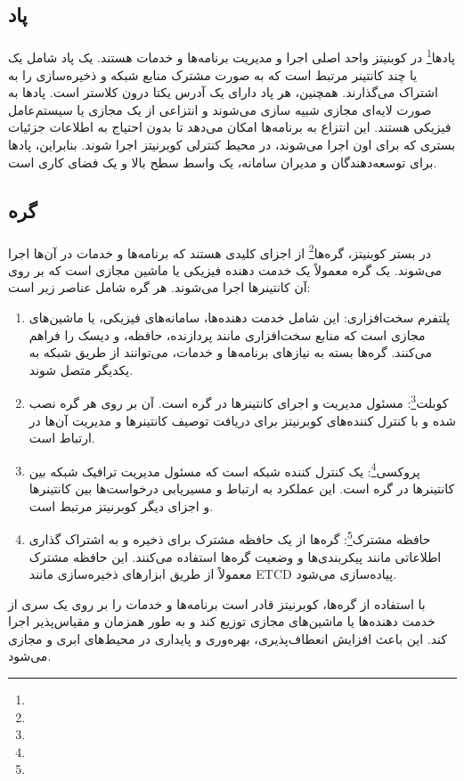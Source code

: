 \subsection{پاد}
\label{subsec:pod}
\paragraph{}
{
    پاد‌ها\footnote{} در کوبنیتز واحد اصلی اجرا و مدیریت برنامه‌ها و خدمات هستند. یک پاد شامل یک یا چند کانتینر مرتبط است که به صورت مشترک منابع شبکه و ذخیره‌سازی را به اشتراک می‌گذارند. همچنین، هر پاد دارای یک آدرس یکتا درون کلاستر است. پاد‌ها به صورت لایه‌ای مجازی شبیه سازی می‌شوند و انتزاعی از یک    مجازی یا سیستم‌عامل فیزیکی هستند. این انتزاع به برنامه‌ها امکان می‌دهد تا بدون احتیاج به اطلاعات جزئیات بستری که برای اون اجرا می‌شوند، در محیط کنترلی کوبرنیتز اجرا شوند. بنابراین، پاد‌ها برای توسعه‌دهندگان و مدیران سامانه، یک واسط سطح بالا و یک فضای کاری است.
}

\subsection{گره}
\label{subsec:node}
\paragraph{}
{
    در بستر کوبنیتز، گره‌ها\footnote{} از اجزای کلیدی هستند که برنامه‌ها و خدمات در آن‌ها اجرا می‌شوند. یک گره 
    معمولاً یک خدمت دهنده‌ فیزیکی یا ماشین مجازی است که بر روی آن کانتینرها اجرا می‌شوند. هر گره شامل عناصر زیر است:
    \begin{enumerate}
        \item پلتفرم سخت‌افزاری: این شامل خدمت دهنده‌ها، سامانه‌های فیزیکی، یا ماشین‌های مجازی است که منابع سخت‌افزاری مانند پردازنده، حافظه، و دیسک را فراهم می‌کنند. گره‌ها بسته به نیازهای برنامه‌ها و خدمات، می‌توانند از طریق شبکه به یکدیگر متصل شوند.
        \item کوبلت\footnote{}: مسئول مدیریت و اجرای کانتینرها در گره است. آن بر روی هر گره نصب شده و با کنترل کننده‌های کوبرنیتز برای دریافت توصیف کانتینرها و مدیریت آن‌ها در ارتباط است.
        \item پروکسی\footnote{}: یک کنترل کننده شبکه است که مسئول مدیریت ترافیک شبکه بین کانتینرها در گره است. این عملکرد به ارتباط و مسیریابی درخواست‌ها بین کانتینرها و اجزای دیگر کوبرنیتز مرتبط است.
        \item حافظه مشترک\footnote{}: گره‌ها از یک حافظه مشترک برای ذخیره و به اشتراک گذاری اطلاعاتی مانند پیکربندی‌ها و وضعیت گره‌ها استفاده می‌کنند. این حافظه مشترک معمولاً از طریق ابزارهای ذخیره‌سازی مانند ETCD پیاده‌سازی می‌شود.
    \end{enumerate}
    با استفاده از گره‌ها، کوبرنیتز قادر است برنامه‌ها و خدمات را بر روی یک سری از خدمت دهنده‌ها یا ماشین‌های مجازی توزیع کند و به طور همزمان و مقیاس‌پذیر اجرا کند. این باعث افزایش انعطاف‌پذیری، بهره‌وری و پایداری در محیط‌های ابری و مجازی می‌شود.
}

